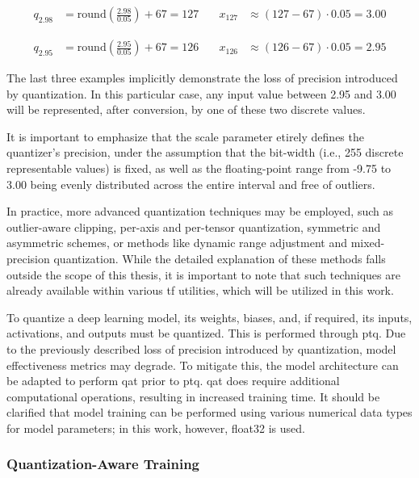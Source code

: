 {\begin{align*}
q_{2.98} &= \text{round}\left(\frac{2.98}{0.05} \right) + 67 = 127
& \quad
x_{127} &\approx \left( 127 - 67 \right) \cdot 0.05 = 3.00
\end{align*}

\begin{align*}
q_{2.95} &= \text{round}\left(\frac{2.95}{0.05} \right) + 67 = 126
& \quad
x_{126} &\approx \left( 126 - 67 \right) \cdot 0.05 = 2.95
\end{align*}

The last three examples implicitly demonstrate the loss of precision introduced by quantization.
In this particular case, any input value between 2.95 and 3.00 will be represented, after conversion, by one of these two discrete values.

It is important to emphasize that the scale parameter etirely defines the quantizer's precision,
under the assumption that the bit-width (i.e., 255 discrete representable values) is fixed,
as well as the floating-point range from -9.75 to 3.00 being evenly distributed across the entire interval and free of outliers.

In practice, more advanced quantization techniques may be employed, such as outlier-aware clipping, per-axis and per-tensor quantization,
symmetric and asymmetric schemes, or methods like dynamic range adjustment and mixed-precision quantization.
While the detailed explanation of these methods falls outside the scope of this thesis,
it is important to note that such techniques are already available within various \gls{tf} utilities, which will be utilized in this work.

To quantize a deep learning model, its weights, biases, and, if required, its inputs, activations, and outputs must be quantized. This is performed through \gls{ptq}.
Due to the previously described loss of precision introduced by quantization, model effectiveness metrics may degrade.
To mitigate this, the model architecture can be adapted to perform \gls{qat} prior to \gls{ptq}.
\gls{qat} does require additional computational operations, resulting in increased training time.
It should be clarified that model training can be performed using various numerical data types for model parameters; in this work, however, \gls{float32} is used.

\subsubsection{Quantization-Aware Training}
\label{subsubsec:qat}

}
